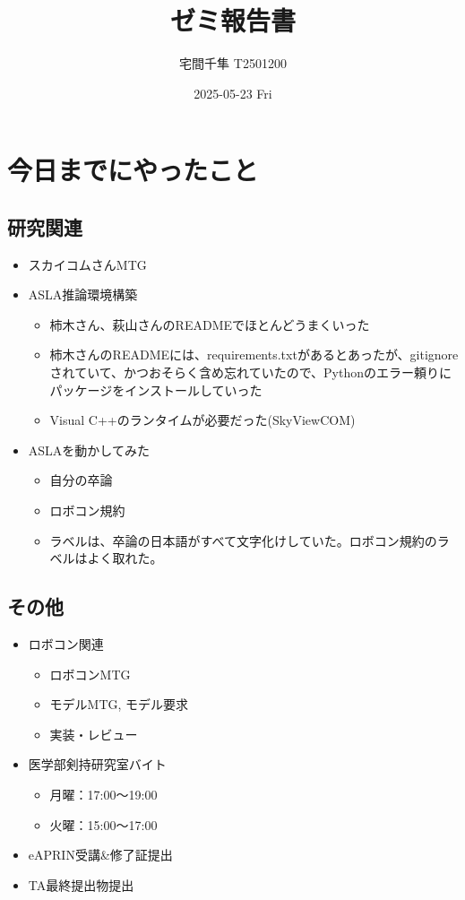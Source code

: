 \documentclass[uplatex, onecolumn, 10pt]{jsarticle}
\begin{document}
\title{\vspace{-40mm}\bf{\LARGE{ゼミ報告書}}}
\author{\vspace{-40mm}宅間千隼 T2501200}
\date{2025-05-23 Fri}
\maketitle


\section{今日までにやったこと}

\subsection*{研究関連} 
\begin{itemize}
	\item スカイコムさんMTG
	\item ASLA推論環境構築
	\begin{itemize}
		\item 柿木さん、萩山さんのREADMEでほとんどうまくいった
		\item 柿木さんのREADMEには、requirements.txtがあるとあったが、gitignoreされていて、かつおそらく含め忘れていたので、Pythonのエラー頼りにパッケージをインストールしていった
		\item Visual C++のランタイムが必要だった(SkyViewCOM)
	\end{itemize}
	\item ASLAを動かしてみた
	\begin{itemize}
		\item 自分の卒論
		\item ロボコン規約
		\item ラベルは、卒論の日本語がすべて文字化けしていた。ロボコン規約のラベルはよく取れた。
	\end{itemize}
\end{itemize}

\subsection*{その他}
\begin{itemize}
	\item ロボコン関連
	\begin{itemize}
		\item ロボコンMTG
		\item モデルMTG, モデル要求
		\item 実装・レビュー
	\end{itemize}
	\item 医学部剣持研究室バイト
	\begin{itemize}
		\item 月曜：17:00～19:00
		\item 火曜：15:00～17:00
	\end{itemize}
	\item eAPRIN受講\&修了証提出
	\item TA最終提出物提出
\end{itemize}
\end{document}
